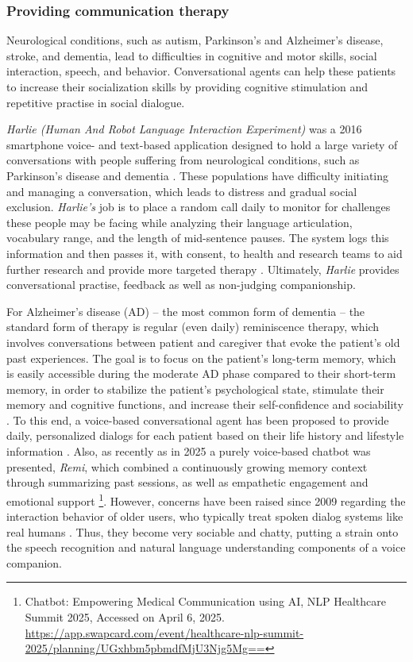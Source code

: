 \subsubsection{Providing communication therapy}\label{communication}
Neurological conditions, such as autism, Parkinson's and Alzheimer's disease, stroke, and dementia, lead to difficulties in cognitive and motor skills, social interaction, speech, and behavior. Conversational agents can help these patients to increase their socialization skills by providing cognitive stimulation and repetitive practise in social dialogue.

\textit{Harlie (Human And Robot Language Interaction Experiment)} was a 2016 smartphone voice- and text-based application designed to hold a large variety of conversations with people suffering from neurological conditions, such as Parkinson's disease and dementia \cite{harlie2016}. These populations have difficulty initiating and managing a conversation, which leads to distress and gradual social exclusion. \textit{Harlie's} job is to place a random call daily to monitor for challenges these people may be facing while analyzing their language articulation, vocabulary range, and the length of mid-sentence pauses. The system logs this information and then passes it, with consent, to health and research teams to aid further research and provide more targeted therapy \cite{csiro_chatbots}. Ultimately, \textit{Harlie} provides conversational practise, feedback as well as non-judging companionship.

For Alzheimer’s disease (AD) -- the most common form of dementia -- the standard form of therapy is regular (even daily) reminiscence therapy, which involves conversations between patient and caregiver that evoke the patient's old past experiences. The goal is to focus on the patient’s long-term memory, which is easily accessible during the moderate AD phase compared to their short-term memory, in order to stabilize the patient's psychological state, stimulate their memory and cognitive functions, and increase their self-confidence and sociability \cite{dementiatherapy2019}. To this end, a voice-based conversational agent has been proposed to provide daily, personalized dialogs for each patient based on their life history and lifestyle information \cite{dementiatherapy2020}. Also, as recently as in 2025 a purely voice-based chatbot was presented, \textit{Remi}, which combined a continuously growing memory context through summarizing past sessions, as well as empathetic engagement and emotional support \footnote{ Chatbot: Empowering Medical Communication using AI, NLP Healthcare Summit 2025, Accessed on April 6, 2025. \url{https://app.swapcard.com/event/healthcare-nlp-summit-2025/planning/UGxhbm5pbmdfMjU3Njg5Mg==}}. However, concerns have been raised since 2009 regarding the interaction behavior of older users, who typically treat spoken dialog systems like real humans \cite{oldsocialstyle2009}. Thus, they become very sociable and chatty, putting a strain onto the speech recognition and natural language understanding components of a voice companion.

